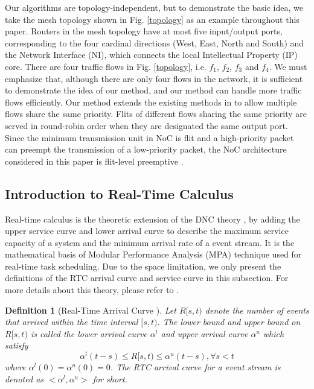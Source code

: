 \documentclass[10pt,journal]{IEEEtran}
\newtheorem{definition}{Definition}
\begin{document}
Our algorithms are topology-independent, but to demonstrate the basic idea, we take the mesh topology shown in Fig. \ref{topology} as an example throughout this paper. Routers in the mesh topology have at most five input/output ports, corresponding to the four cardinal directions (West, East, North and South) and the Network Interface (NI), which connects the local Intellectual Property (IP) core. There are four traffic flows in Fig. \ref{topology}, i.e. $f_1$, $f_2$, $f_3$ and $f_4$. We must emphasize that, although there are only four flows in the network, it is sufficient to demonstrate the idea of our method, and our method can handle more traffic flows efficiently. Our method extends the existing methods in \cite{73}\cite{Qian489900} to allow multiple flows share the same priority. Flits of different flows sharing the same priority are served in round-robin order when they are designated the same output port. Since the minimum transmission unit in NoC is flit and a high-priority packet can preempt the transmission of a low-priority packet, the NoC architecture considered in this paper is flit-level preemptive \cite{Lee:2003:RWC:846077.846083}.

\subsection{Introduction to Real-Time Calculus}\label{intrortc}
Real-time calculus \cite{1253607} is the theoretic extension of the DNC theory \cite{Boudec2001Network}, by adding the upper service curve and lower arrival curve to describe the maximum service capacity of a system and the minimum arrival rate of a event stream. It is the mathematical basis of Modular Performance Analysis (MPA) \cite{Wandeler2006System} technique used for real-time task scheduling. Due to the space limitation, we only present the definitions of the RTC arrival curve and service curve in this subsection. For more details about this theory, please refer to \cite{1253607}.
\begin{definition}[Real-Time Arrival Curve \cite{1253607}]
Let $R[s,t)$ denote the number of events that arrived within the time interval $[s,t)$. The lower bound and upper bound on $R[s,t)$ is called the lower arrival curve $\alpha^l$ and upper arrival curve $\alpha^u$ which satisfy
$$\alpha^l(t-s)\leq R[s,t)\leq \alpha^u(t-s),\forall s<t$$
where $\alpha^l(0)=\alpha^u(0)=0$. The RTC arrival curve for a event stream is denoted as $<\alpha^l,\alpha^u>$ for short.
\end{definition}
\end{document}
